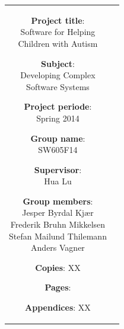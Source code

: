     \begin{tabular}{cc}
	
        \parbox[3cm]{7cm}{ %
	\vspace{7mm}
            \begin{description}
                \item {\textbf{Project title}:} \\
                    Software for Helping \\
                    Children with Autism
                    \hspace{4cm}
                \item {\textbf{Subject}:} \\
                  Developing Complex \\
                  Software Systems
            \end{description}
	\vspace{-4mm}
            \parbox{8cm}{ %
                \begin{description}
                    \item {\textbf{Project periode}:} \\
                        Spring 2014
                    \hspace{4cm}
                    \item {\textbf{Group name}:} \\
                        SW605F14
                    \hspace{4cm}
                    \item {\textbf{Supervisor}:} \\
                        Hua Lu
                    \item {\textbf{Group members}:}\\%
                    Jesper Byrdal Kjær\\[0.20cm]
                    Frederik Bruhn Mikkelsen\\[0.20cm]
					Stefan Mailund Thilemann\\[0.20cm]
					Anders Vagner
                \end{description}
            }
	    \vspace{-4mm}
            \begin{description}
                \item {\textbf{Copies}:} XX
                \item {\textbf{Pages}:} \pageref{LastPage}
                \item {\textbf{Appendices}: XX} 

\end{description}}
\end{tabular}
